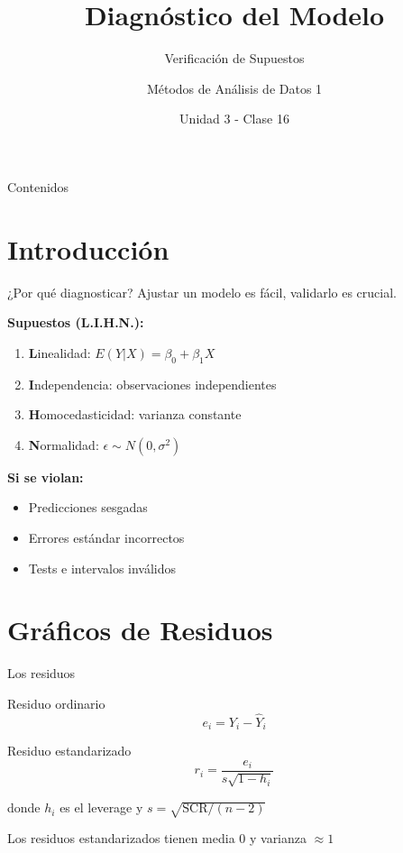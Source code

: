 \documentclass[aspectratio=169]{beamer}
\title{Diagnóstico del Modelo}
\subtitle{Verificación de Supuestos}
\author{Métodos de Análisis de Datos 1}
\institute{Universidad Nacional del Sur}
\date{Unidad 3 - Clase 16}
\begin{document}
\frame{\titlepage}

\begin{frame}{Contenidos}
\tableofcontents
\end{frame}

\section{Introducción}

\begin{frame}{¿Por qué diagnosticar?}
Ajustar un modelo es fácil, validarlo es crucial.

\vspace{0.5cm}
\textbf{Supuestos (L.I.H.N.):}
\begin{enumerate}
    \item \textbf{L}inealidad: $E(Y|X) = \beta_0 + \beta_1 X$
    \item \textbf{I}ndependencia: observaciones independientes
    \item \textbf{H}omocedasticidad: varianza constante
    \item \textbf{N}ormalidad: $\epsilon \sim N(0, \sigma^2)$
\end{enumerate}

\vspace{0.5cm}
\textbf{Si se violan:}
\begin{itemize}
    \item Predicciones sesgadas
    \item Errores estándar incorrectos
    \item Tests e intervalos inválidos
\end{itemize}
\end{frame}

\section{Gráficos de Residuos}

\begin{frame}{Los residuos}
\begin{block}{Residuo ordinario}
\[
e_i = Y_i - \hat{Y}_i
\]
\end{block}

\begin{block}{Residuo estandarizado}
\[
r_i = \frac{e_i}{s\sqrt{1 - h_i}}
\]
\end{block}

donde $h_i$ es el leverage y $s = \sqrt{\text{SCR}/(n-2)}$

\vspace{0.3cm}
Los residuos estandarizados tienen media 0 y varianza $\approx 1$
\end{frame}
\end{document}
